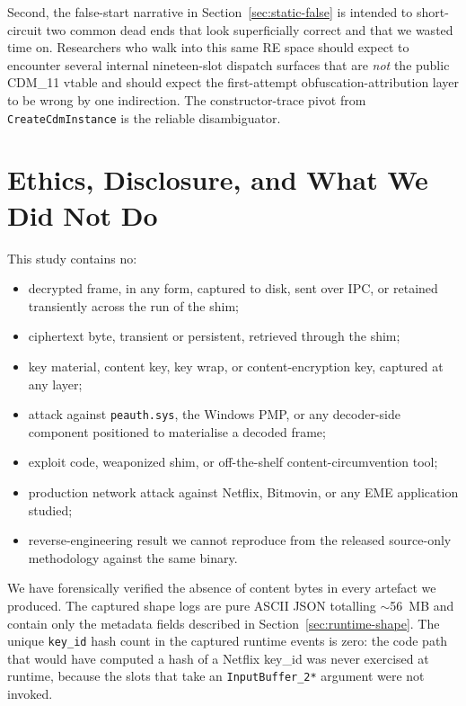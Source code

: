 \documentclass[11pt,letterpaper]{article}
\let\oldsection\section
\renewcommand{\section}{\clearpage\oldsection}
\begin{document}
Second, the false-start narrative in
Section~\ref{sec:static-false} is intended to short-circuit two
common dead ends that look superficially correct and that we wasted
time on. Researchers who walk into this same RE space should expect
to encounter several internal nineteen-slot dispatch surfaces that
are \emph{not} the public CDM\_11 vtable and should expect the
first-attempt obfuscation-attribution layer to be wrong by one
indirection. The constructor-trace pivot from
\texttt{CreateCdmInstance} is the reliable disambiguator.

\section{Ethics, Disclosure, and What We Did Not Do}
\label{sec:ethics}

This study contains no:
\begin{itemize}[itemsep=1pt,topsep=2pt]
\item decrypted frame, in any form, captured to disk, sent over IPC,
      or retained transiently across the run of the shim;
\item ciphertext byte, transient or persistent, retrieved through
      the shim;
\item key material, content key, key wrap, or content-encryption
      key, captured at any layer;
\item attack against \texttt{peauth.sys}, the Windows PMP, or any
      decoder-side component positioned to materialise a decoded
      frame;
\item exploit code, weaponized shim, or off-the-shelf
      content-circumvention tool;
\item production network attack against Netflix, Bitmovin, or any
      EME application studied;
\item reverse-engineering result we cannot reproduce from the
      released source-only methodology against the same binary.
\end{itemize}

We have forensically verified the absence of content bytes in every
artefact we produced. The captured shape logs are pure ASCII JSON
totalling $\sim$56~MB and contain only the metadata fields described
in Section~\ref{sec:runtime-shape}. The unique \texttt{key\_id}
hash count in the captured runtime events is zero: the code path
that would have computed a hash of a Netflix key\_id was never
exercised at runtime, because the slots that take an
\texttt{InputBuffer\_2*} argument were not invoked.
\end{document}

